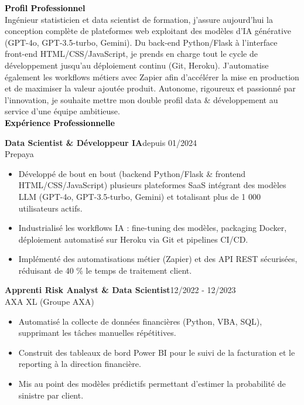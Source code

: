 \documentclass{article}
\begin{document}
\begin{paracol}{2}
\textcolor{black}{\Large \textbf{Profil Professionnel}} \\[2pt]
Ingénieur statisticien et data scientist de formation, j’assure aujourd’hui la conception complète de plateformes web exploitant des modèles d’IA générative (GPT-4o, GPT-3.5-turbo, Gemini). Du back-end Python/Flask à l’interface front-end HTML/CSS/JavaScript, je prends en charge tout le cycle de développement jusqu’au déploiement continu (Git, Heroku). J’automatise également les workflows métiers avec Zapier afin d’accélérer la mise en production et de maximiser la valeur ajoutée produit. Autonome, rigoureux et passionné par l’innovation, je souhaite mettre mon double profil data \& développement au service d’une équipe ambitieuse. \\[8pt]

\textcolor{black}{\Large \textbf{Expérience Professionnelle}} \\[2pt]
\colorbox{maincolor}{%
  \begin{minipage}{\linewidth}
    \noindent
    \textbf{Data Scientist \& Développeur IA}\hfill depuis 01/2024\\
    Prepaya\\[-0.3em]
    \begin{itemize}[leftmargin=*]
      \item Développé de bout en bout (backend Python/Flask \& frontend HTML/CSS/JavaScript) plusieurs plateformes SaaS intégrant des modèles LLM (GPT-4o, GPT-3.5-turbo, Gemini) et totalisant plus de 1 000 utilisateurs actifs. \item Industrialisé les workflows IA : fine-tuning des modèles, packaging Docker, déploiement automatisé sur Heroku via Git et pipelines CI/CD. \item Implémenté des automatisations métier (Zapier) et des API REST sécurisées, réduisant de 40 \% le temps de traitement client.
    \end{itemize}
  \end{minipage}}

\vspace{3mm}

\colorbox{maincolor}{%
  \begin{minipage}{\linewidth}
    \noindent
    \textbf{Apprenti Risk Analyst \& Data Scientist}\hfill 12/2022 - 12/2023\\
    AXA XL (Groupe AXA)\\[-0.3em]
    \begin{itemize}[leftmargin=*]
      \item Automatisé la collecte de données financières (Python, VBA, SQL), supprimant les tâches manuelles répétitives. \item Construit des tableaux de bord Power BI pour le suivi de la facturation et le reporting à la direction financière. \item Mis au point des modèles prédictifs permettant d’estimer la probabilité de sinistre par client.
    \end{itemize}
  \end{minipage}}


\end{paracol}
\end{document}
